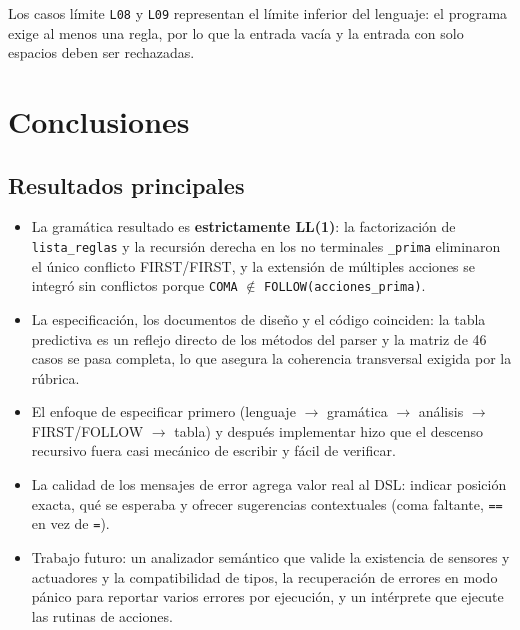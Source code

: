 \documentclass[12pt,a4paper]{article}
\begin{document}
Los casos límite \texttt{L08} y \texttt{L09} representan el límite inferior
del lenguaje: el programa exige al menos una regla, por lo que la entrada
vacía y la entrada con solo espacios deben ser rechazadas.

\section{Conclusiones}

\subsection{Resultados principales}
\begin{itemize}
  \item La gramática resultado es \textbf{estrictamente LL(1)}: la factorización
        de \texttt{lista\_reglas} y la recursión derecha en los no terminales
        \texttt{\_prima} eliminaron el único conflicto FIRST/FIRST, y la
        extensión de múltiples acciones se integró sin conflictos porque
        \texttt{COMA} $\notin$ \texttt{FOLLOW(acciones\_prima)}.
  \item La especificación, los documentos de diseño y el código coinciden:
        la tabla predictiva es un reflejo directo de los métodos del parser y
        la matriz de 46 casos se pasa completa, lo que asegura la coherencia
        transversal exigida por la rúbrica.
  \item El enfoque de especificar primero (lenguaje $\to$ gramática $\to$
        análisis $\to$ FIRST/FOLLOW $\to$ tabla) y después implementar hizo
        que el descenso recursivo fuera casi mecánico de escribir y fácil de
        verificar.
  \item La calidad de los mensajes de error agrega valor real al DSL: indicar
        posición exacta, qué se esperaba y ofrecer sugerencias contextuales
        (coma faltante, \texttt{==} en vez de \texttt{=}).
  \item Trabajo futuro: un analizador semántico que valide la existencia de
        sensores y actuadores y la compatibilidad de tipos, la recuperación
        de errores en modo pánico para reportar varios errores por
        ejecución, y un intérprete que ejecute las rutinas de acciones.
\end{itemize}

\appendix
\end{document}
